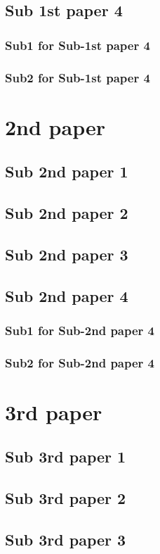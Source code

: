 \documentclass[12pt,a4paper]{report}
\begin{document}
\section{Sub 1st paper 4}
\subsection{Sub1  for Sub-1st paper 4}
\subsection{Sub2  for Sub-1st paper 4}
\chapter{2nd paper}
\noindent{\rule{\textwidth}{1.5pt}}
\section{Sub 2nd paper 1}
\section{Sub 2nd paper 2}
\section{Sub 2nd paper 3}
\section{Sub 2nd paper 4}
\subsection{Sub1  for Sub-2nd paper 4}
\subsection{Sub2  for Sub-2nd paper 4}
\chapter{3rd paper}
\noindent{\rule{\textwidth}{1.5pt}}
\section{Sub 3rd paper 1}
\section{Sub 3rd paper 2}
\section{Sub 3rd paper 3}
\end{document}
